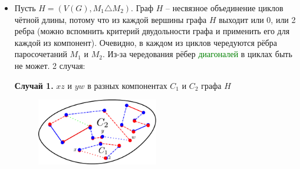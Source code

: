 \begin{frame}[t]
    \begin{itemize}
        \item Пусть $H = (V (G ), M_1 \triangle M_2 )$. Граф $H$ -- несвязное объединение циклов чётной длины, потому что из каждой вершины  графа $H$ выходит или 0, или 2 ребра (можно вспомнить критерий двудольности графа и применить его для каждой из компонент). Очевидно, в каждом из циклов чередуются рёбра паросочетаний $M_1$ и $M_2$. Из-за чередования рёбер \textcolor{green}{диагоналей} в циклах быть не может. 2 случая: 

            \vspace{5mm}
        \textbf{Случай 1.} $xz$ и $yw$ в разных компонентах $C_1$ и $C_2$ графа $H$

            \begin{figure}[b]
                \centering
                \includegraphics[width=0.5\textwidth]{images/case1}
                \label{fig:case1}
            \end{figure}
    \end{itemize}
\end{frame}

